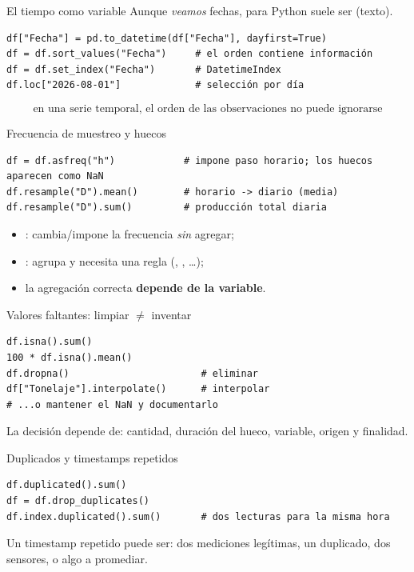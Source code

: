 \begin{frame}[fragile]{El tiempo como variable}
Aunque \emph{veamos} fechas, para Python  suele ser  (texto).
\begin{lstlisting}
df["Fecha"] = pd.to_datetime(df["Fecha"], dayfirst=True)
df = df.sort_values("Fecha")     # el orden contiene información
df = df.set_index("Fecha")       # DatetimeIndex
df.loc["2026-08-01"]             # selección por día
\end{lstlisting}
\vfill
\[
\boxed{\text{en una serie temporal, el orden de las observaciones no puede ignorarse}}
\]
\end{frame}

\begin{frame}[fragile]{Frecuencia de muestreo y huecos}
\begin{lstlisting}
df = df.asfreq("h")            # impone paso horario; los huecos aparecen como NaN
df.resample("D").mean()        # horario -> diario (media)
df.resample("D").sum()         # producción total diaria
\end{lstlisting}
\begin{itemize}
  \item {}: cambia/impone la frecuencia \emph{sin} agregar;
  \item {}: agrupa y necesita una regla (, , \ldots);
  \item la agregación correcta \textbf{depende de la variable}.
\end{itemize}
\end{frame}

\begin{frame}[fragile]{Valores faltantes: limpiar $\neq$ inventar}
\begin{lstlisting}
df.isna().sum()
100 * df.isna().mean()
df.dropna()                       # eliminar
df["Tonelaje"].interpolate()      # interpolar
# ...o mantener el NaN y documentarlo
\end{lstlisting}
La decisión depende de: cantidad, duración del hueco, variable, origen y finalidad.
\end{frame}

\begin{frame}[fragile]{Duplicados y timestamps repetidos}
\begin{lstlisting}
df.duplicated().sum()
df = df.drop_duplicates()
df.index.duplicated().sum()       # dos lecturas para la misma hora
\end{lstlisting}
\vspace{0.4em}
Un timestamp repetido puede ser: dos mediciones legítimas, un duplicado, dos sensores, o algo a promediar.
\end{frame}

